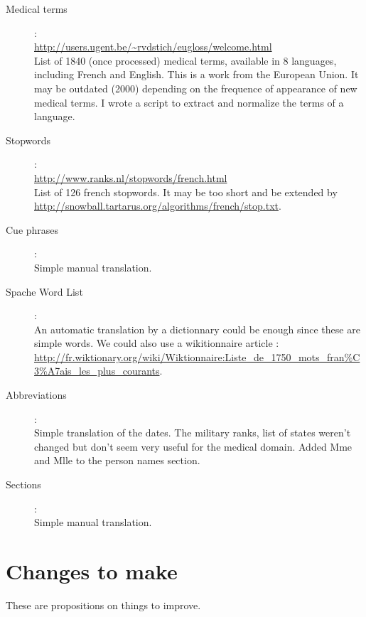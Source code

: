 \documentclass[a4paper,10pt]{article}
\begin{document}
\begin{description}
\item[Medical terms] : \hfill \\
  \url{http://users.ugent.be/~rvdstich/eugloss/welcome.html}\\
  List of 1840 (once processed) medical terms, available in 8
  languages, including French and English. This is a work from the
  European Union. It may be outdated (2000) depending on the frequence
  of appearance of new medical terms.
  I wrote a script to extract and normalize the terms of a language.
\item[Stopwords] : \hfill \\
  \url{http://www.ranks.nl/stopwords/french.html}\\
  List of 126 french stopwords. It may be too short and be extended by
  \url{http://snowball.tartarus.org/algorithms/french/stop.txt}.
\item[Cue phrases] : \hfill \\
  Simple manual translation.
\item[Spache Word List] : \hfill \\
  An automatic translation by a dictionnary could be enough since
  these are simple words. We could also use a wikitionnaire article :
  \url{http://fr.wiktionary.org/wiki/Wiktionnaire:Liste_de_1750_mots_fran%C3%A7ais_les_plus_courants}.

\item[Abbreviations] : \hfill \\
  Simple translation of the dates. The military ranks, list of states
  weren't changed but don't seem very useful for the medical
  domain. Added Mme and Mlle to the person names section.
\item[Sections] : \hfill \\
  Simple manual translation.
  
    


\end{description}


\section{Changes to make}
\label{sec:todo}

These are propositions on things to improve.
\end{document}
